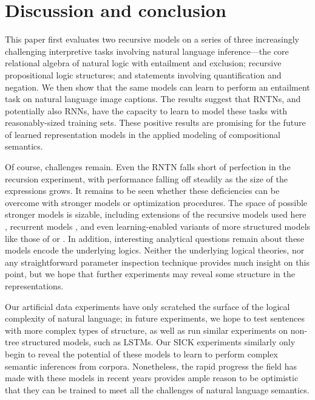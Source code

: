 \section{Discussion and conclusion}\label{sec:discussion}

This paper first evaluates two recursive models on a series of three increasingly
challenging interpretive tasks involving natural language inference---the 
core relational algebra of natural logic with entailment and
exclusion; recursive propositional logic structures; and statements
involving quantification and negation. We then show that the same models can learn to
perform an entailment task on natural language image captions. The results suggest that RNTNs,
and potentially also RNNs, have the capacity to learn to model these tasks with 
reasonably-sized training sets. These positive results are
promising for the future of learned representation models in the
applied modeling of compositional semantics.


Of course, challenges remain. Even
the RNTN falls short of perfection in the recursion experiment, with
performance falling off steadily as the size of the expressions grows. It
remains to be seen whether these deficiencies can be overcome with
stronger models or optimization procedures. The space of possible stronger
models is sizable, including extensions of the recursive models used here
\cite{sochergrounded,kalchbrenner2014convolutional,irsoydeep}, recurrent
models \cite{sutskever2014sequence}, and even learning-enabled variants 
of more structured models like those of  or .
In addition, interesting analytical questions remain about  these models encode
the underlying logics. Neither the underlying
logical theories, nor any straightforward parameter inspection technique provides 
much insight on this point, but we hope that further experiments may reveal 
some structure in the representations.

Our artificial data experiments have only scratched the surface 
of the logical complexity of natural language; in future experiments, we hope to test sentences
with more complex types of structure, as well as run similar experiments on non-tree structured models, such as LSTMs. Our SICK experiments 
similarly only begin to reveal the potential of these models to learn to 
perform complex semantic inferences from corpora. Nonetheless, the
rapid progress the field has made with these models in recent years
provides ample reason to be optimistic that they can be trained to
meet all the challenges of natural language semantics.

